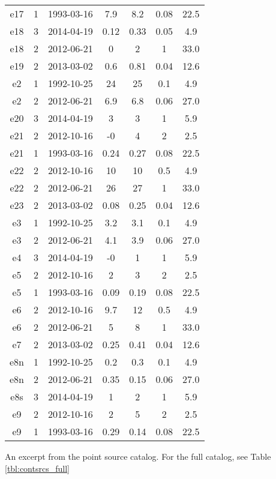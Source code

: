 \begin{table*}[htp]
\begin{tabular}{ccccccc}
e17 & 1 & 1993-03-16 & 7.9 & 8.2 & 0.08 & 22.5 \\
e18 & 3 & 2014-04-19 & 0.12 & 0.33 & 0.05 & 4.9 \\
e18 & 2 & 2012-06-21 & 0 & 2 & 1 & 33.0 \\
e19 & 2 & 2013-03-02 & 0.6 & 0.81 & 0.04 & 12.6 \\
e2 & 1 & 1992-10-25 & 24 & 25 & 0.1 & 4.9 \\
e2 & 2 & 2012-06-21 & 6.9 & 6.8 & 0.06 & 27.0 \\
e20 & 3 & 2014-04-19 & 3 & 3 & 1 & 5.9 \\
e21 & 2 & 2012-10-16 & -0 & 4 & 2 & 2.5 \\
e21 & 1 & 1993-03-16 & 0.24 & 0.27 & 0.08 & 22.5 \\
e22 & 2 & 2012-10-16 & 10 & 10 & 0.5 & 4.9 \\
e22 & 2 & 2012-06-21 & 26 & 27 & 1 & 33.0 \\
e23 & 2 & 2013-03-02 & 0.08 & 0.25 & 0.04 & 12.6 \\
e3 & 1 & 1992-10-25 & 3.2 & 3.1 & 0.1 & 4.9 \\
e3 & 2 & 2012-06-21 & 4.1 & 3.9 & 0.06 & 27.0 \\
e4 & 3 & 2014-04-19 & -0 & 1 & 1 & 5.9 \\
e5 & 2 & 2012-10-16 & 2 & 3 & 2 & 2.5 \\
e5 & 1 & 1993-03-16 & 0.09 & 0.19 & 0.08 & 22.5 \\
e6 & 2 & 2012-10-16 & 9.7 & 12 & 0.5 & 4.9 \\
e6 & 2 & 2012-06-21 & 5 & 8 & 1 & 33.0 \\
e7 & 2 & 2013-03-02 & 0.25 & 0.41 & 0.04 & 12.6 \\
e8n & 1 & 1992-10-25 & 0.2 & 0.3 & 0.1 & 4.9 \\
e8n & 2 & 2012-06-21 & 0.35 & 0.15 & 0.06 & 27.0 \\
e8s & 3 & 2014-04-19 & 1 & 2 & 1 & 5.9 \\
e9 & 2 & 2012-10-16 & 2 & 5 & 2 & 2.5 \\
e9 & 1 & 1993-03-16 & 0.29 & 0.14 & 0.08 & 22.5 \\
\hline
\end{tabular}
\par
An excerpt from the point source catalog.  For the full catalog, see Table \ref{tbl:contsrcs_full}
\end{table*}
